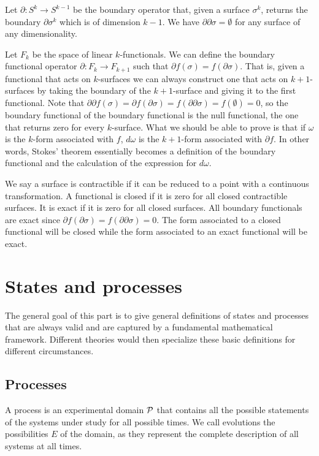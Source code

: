 \documentclass[11pt,letterpaper,fleqn]{memoir} %
\begin{document}
Let $\partial : S^k \to S^{k-1}$ be the boundary operator that, given a surface $\sigma^k$, returns the boundary $\partial \sigma^k$ which is of dimension $k-1$. We have $\partial\partial\sigma = \emptyset$ for any surface of any dimensionality.

Let $F_k$ be the space of linear $k$-functionals. We can define the boundary functional operator $\partial : F_k \to F_{k+1}$ such that $\partial f(\sigma) = f(\partial \sigma)$. That is, given a functional that acts on $k$-surfaces we can always construct one that acts on $k+1$-surfaces by taking the boundary of the $k+1$-surface and giving it to the first functional. Note that $\partial\partial f(\sigma) = \partial f(\partial\sigma) =  f(\partial\partial\sigma) = f(\emptyset) = 0$, so the boundary functional of the boundary functional is the null functional, the one that returns zero for every $k$-surface. What we should be able to prove is that if $\omega$ is the $k$-form associated with $f$, $d\omega$ is the $k+1$-form associated with $\partial f$. In other words, Stokes' theorem essentially becomes a definition of the boundary functional and the calculation of the expression for $d\omega$.

We say a surface is contractible if it can be reduced to a point with a continuous transformation. A functional is closed if it is zero for all closed contractible surfaces. It is exact if it is zero for all closed surfaces. All boundary functionals are exact since $\partial f (\partial \sigma) =  f (\partial\partial \sigma) = 0$. The form associated to a closed functional will be closed while the form associated to an exact functional will be exact.

\section{States and processes}

The general goal of this part is to give general definitions of states and processes that are always valid and are captured by a fundamental mathematical framework. Different theories would then specialize these basic definitions for different circumstances.

\subsection{Processes}

A process is an experimental domain $\edomain[P]$ that contains all the possible statements of the systems under study for all possible times. We call evolutions the possibilities $E$ of the domain, as they represent the complete description of all systems at all times.
\end{document}
